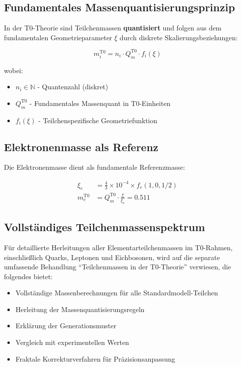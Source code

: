 	\subsection{Fundamentales Massenquantisierungsprinzip}
	
	In der T0-Theorie sind Teilchenmassen \textbf{quantisiert} und folgen aus dem fundamentalen Geometrieparameter $\xi$ durch diskrete Skalierungsbeziehungen:
	
	\begin{equation}
		m_i^{\mathrm{T0}} = n_i \cdot Q_m^{\mathrm{T0}} \cdot f_i(\xi)
	\end{equation}
	
	wobei:
	\begin{itemize}
		\item $n_i \in \mathbb{N}$ - Quantenzahl (diskret)
		\item $Q_m^{\mathrm{T0}}$ - Fundamentales Massenquant in T0-Einheiten
		\item $f_i(\xi)$ - Teilchenspezifische Geometriefunktion
	\end{itemize}
	
	\subsection{Elektronenmasse als Referenz}
	
	Die Elektronenmasse dient als fundamentale Referenzmasse:
	
	\begin{align}
		\xi_e &= \frac{4}{3} \times 10^{-4} \times f_e(1,0,1/2) \\
		m_e^{\mathrm{T0}} &= Q_m^{\mathrm{T0}} \cdot \frac{\xi}{\xi_e} = 0.511
	\end{align}
	
	\subsection{Vollständiges Teilchenmassenspektrum}
	
	Für detaillierte Herleitungen aller Elementarteilchenmassen im T0-Rahmen, einschließlich Quarks, Leptonen und Eichbosonen, wird auf die separate umfassende Behandlung ``Teilchenmassen in der T0-Theorie'' verwiesen, die folgendes bietet:
	
	\begin{itemize}
		\item Vollständige Massenberechnungen für alle Standardmodell-Teilchen
		\item Herleitung der Massenquantisierungsregeln
		\item Erklärung der Generationsmuster
		\item Vergleich mit experimentellen Werten
		\item Fraktale Korrekturverfahren für Präzisionsanpassung
	\end{itemize}
	
